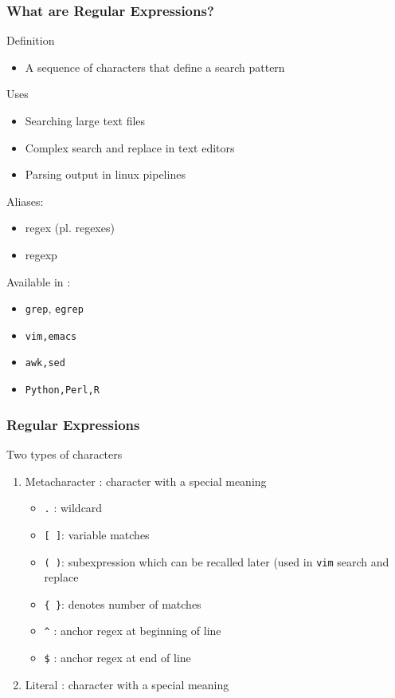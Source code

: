 \documentclass{beamer}
\newcommand{\code}[1]{\colorbox{codegray}{\texttt{#1}}}
\begin{document}
\begin{frame}
\frametitle{What are Regular Expressions?}
Definition
\begin{itemize}
    \item A sequence of characters that define a search pattern
\end{itemize}
\pause
Uses
\begin{itemize}
    \item Searching large text files
    \pause
    \item Complex search and replace in text editors
    \pause
    \item Parsing output in linux pipelines
\end{itemize}
\pause
Aliases:
\begin{itemize}
    \item regex (pl. regexes)
    \pause
    \item regexp
\end{itemize}
\pause
Available in :
\begin{itemize}
    \item \code{grep}, \code{egrep}
    \pause
    \item \code{vim,emacs}
    \pause
    \item \code{awk,sed}
    \pause
    \item \code{Python,Perl,R}
\end{itemize}
\end{frame}


\begin{frame}
\frametitle{Regular Expressions}
Two types of characters
\begin{enumerate}
    \item Metacharacter : character with a special meaning
    \begin{itemize}
        \item \code{.} : wildcard 
        \pause
        \item \code{[ ]}: variable matches
        \pause
        \item \code{( )}: subexpression which can be recalled later (used in \code{vim} search and replace
        \pause
        \item \code{\{ \}}: denotes number of matches
        \pause
        \item \code{\^{}} : anchor regex at beginning of line
        \pause
        \item \code{\$} : anchor regex at end of line
    \end{itemize}
    \pause
    \item Literal : character with a special meaning
\end{enumerate}
\end{frame}
\end{document}
